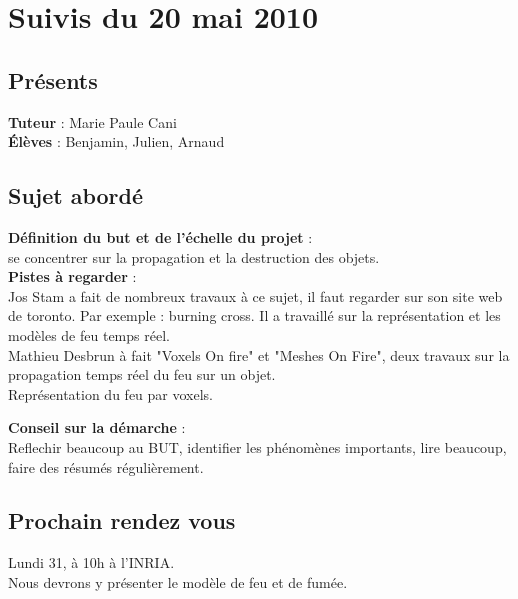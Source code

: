 \documentclass[a4paper,10pt]{article}
\begin{document}
\newpage







\section{Suivis du  20 mai 2010}
\subsection{Présents}
\textbf{Tuteur} : Marie Paule Cani \\
\textbf{Élèves} : Benjamin, Julien, Arnaud \\
\subsection{Sujet abordé}
\textbf{Définition du but et de l'échelle du projet} :  \\
se concentrer sur la propagation et la destruction des objets.\\
\textbf{Pistes à regarder} : \\
Jos Stam a fait de nombreux travaux à ce sujet, il faut regarder sur son site web de toronto. Par exemple : burning cross. Il a travaillé sur la représentation et  les modèles de feu temps réel.\\
Mathieu Desbrun à fait "Voxels On fire" et "Meshes On Fire", deux travaux sur la propagation temps réel du feu sur un objet.\\
Représentation du feu par voxels.


\textbf{Conseil sur la démarche} : \\
Reflechir beaucoup au BUT,
identifier les phénomènes importants,
lire beaucoup,
faire des résumés régulièrement.

\subsection{Prochain rendez vous}
Lundi 31, à 10h à l'INRIA.\\
Nous devrons y présenter le modèle de feu et de fumée.



\end{document}
